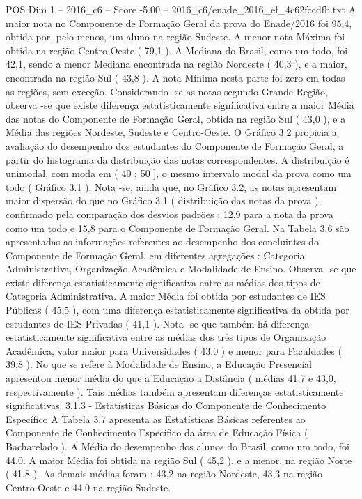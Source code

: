 \begin{textsample}{POS Dim 1 – 2016\_c6 – Score -5.00 – 2016\_c6/enade\_2016\_ef\_4c62fccdfb.txt}
A maior nota no Componente de Formação Geral da prova do Enade/2016 foi 95,4, obtida por, pelo menos, um aluno na região Sudeste.
A menor nota Máxima foi obtida na região Centro-Oeste ( 79,1 ).
A Mediana do Brasil, como um todo, foi 42,1, sendo a menor Mediana encontrada na região Nordeste ( 40,3 ), e a maior, encontrada na região Sul ( 43,8 ).
A nota Mínima nesta parte foi zero em todas as regiões, sem exceção.
Considerando -se as notas segundo Grande Região, observa -se que existe diferença estatisticamente significativa entre a maior Média das notas do Componente de Formação Geral, obtida na região Sul ( 43,0 ), e a Média das regiões Nordeste, Sudeste e Centro-Oeste.
O Gráfico 3.2 propicia a avaliação do desempenho dos estudantes do Componente de Formação Geral, a partir do histograma da distribuição das notas correspondentes.
A distribuição é unimodal, com moda em ( 40 ; 50 ], o mesmo intervalo modal da prova como um todo ( Gráfico 3.1 ).
Nota -se, ainda que, no Gráfico 3.2, as notas apresentam maior dispersão do que no Gráfico 3.1 ( distribuição das notas da prova ), confirmado pela comparação dos desvios padrões : 12,9 para a nota da prova como um todo e 15,8 para o Componente de Formação Geral.
Na Tabela 3.6 são apresentadas as informações referentes ao desempenho dos concluintes do Componente de Formação Geral, em diferentes agregações : Categoria Administrativa, Organização Acadêmica e Modalidade de Ensino.
Observa -se que existe diferença estatisticamente significativa entre as médias dos tipos de Categoria Administrativa.
A maior Média foi obtida por estudantes de IES Públicas ( 45,5 ), com uma diferença estatisticamente significativa da obtida por estudantes de IES Privadas ( 41,1 ).
Nota -se que também há diferença estatisticamente significativa entre as médias dos três tipos de Organização Acadêmica, valor maior para Universidades ( 43,0 ) e menor para Faculdades ( 39,8 ).
No que se refere à Modalidade de Ensino, a Educação Presencial apresentou menor média do que a Educação a Distância ( médias 41,7 e 43,0, respectivamente ).
Tais médias também apresentam diferenças estatisticamente significativas. 3.1.3 - Estatísticas Básicas do Componente de Conhecimento Específico A Tabela 3.7 apresenta as Estatísticas Básicas referentes ao Componente de Conhecimento Específico da área de Educação Física ( Bacharelado ).
A Média do desempenho dos alunos do Brasil, como um todo, foi 44,0.
A maior Média foi obtida na região Sul ( 45,2 ), e a menor, na região Norte ( 41,8 ).
As demais médias foram : 43,2 na região Nordeste, 43,3 na região Centro-Oeste e 44,0 na região Sudeste.

\end{textsample}
